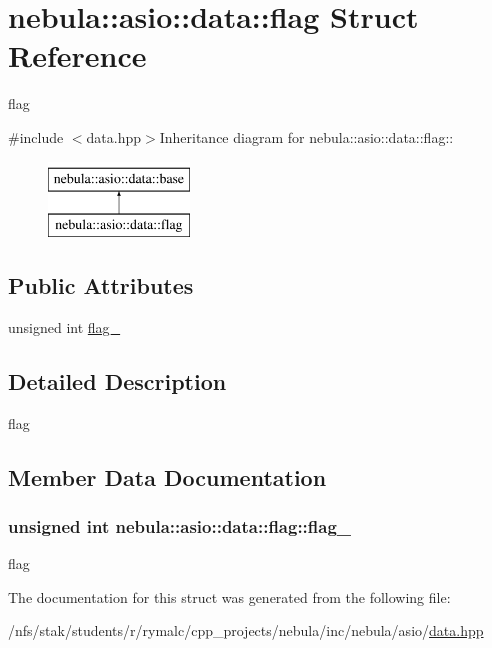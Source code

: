 \hypertarget{structnebula_1_1asio_1_1data_1_1flag}{
\section{nebula::asio::data::flag Struct Reference}
\label{structnebula_1_1asio_1_1data_1_1flag}
}


flag  


{\ttfamily \#include $<$data.hpp$>$}Inheritance diagram for nebula::asio::data::flag::\begin{figure}[H]
\begin{center}
\leavevmode
\includegraphics[height=2cm]{structnebula_1_1asio_1_1data_1_1flag}
\end{center}
\end{figure}
\subsection*{Public Attributes}
\begin{DoxyCompactItemize}
\item 
unsigned int \hyperlink{structnebula_1_1asio_1_1data_1_1flag_a5a94751cdb145df7b12984c1cdb3f154}{flag\_\-}
\end{DoxyCompactItemize}


\subsection{Detailed Description}
flag 

\subsection{Member Data Documentation}
\hypertarget{structnebula_1_1asio_1_1data_1_1flag_a5a94751cdb145df7b12984c1cdb3f154}{
\subsubsection[{flag\_\-}]{\setlength{\rightskip}{0pt plus 5cm}unsigned int {\bf nebula::asio::data::flag::flag\_\-}}}
\label{structnebula_1_1asio_1_1data_1_1flag_a5a94751cdb145df7b12984c1cdb3f154}
flag 

The documentation for this struct was generated from the following file:\begin{DoxyCompactItemize}
\item 
/nfs/stak/students/r/rymalc/cpp\_\-projects/nebula/inc/nebula/asio/\hyperlink{data_8hpp}{data.hpp}\end{DoxyCompactItemize}

